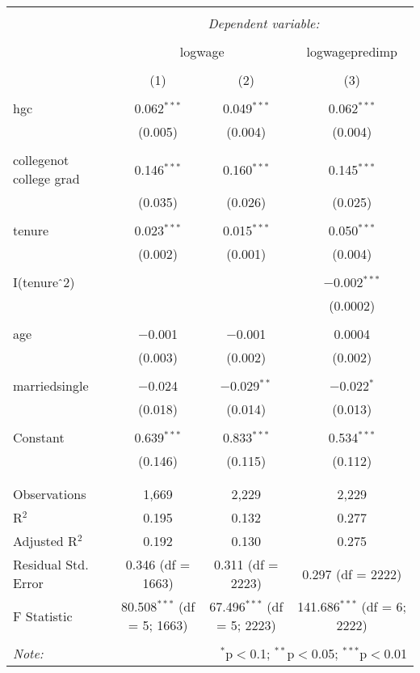 \documentclass{article}
\begin{document}
\begin{table}[!htbp] \centering 
  \caption{} 
  \label{} 
\begin{tabular}{@{\extracolsep{3pt}}lccc} 
\\[-1.7ex]\hline 
\hline \\[-1.8ex] 
 & \multicolumn{3}{c}{\textit{Dependent variable:}} \\ 
\cline{2-4} 
\\[-1.8ex] & \multicolumn{2}{c}{logwage} & logwagepredimp \\ 
\\[-1.8ex] & (1) & (2) & (3)\\ 
\hline \\[-1.8ex] 
 hgc & 0.062$^{***}$ & 0.049$^{***}$ & 0.062$^{***}$ \\ 
  & (0.005) & (0.004) & (0.004) \\ 
  & & & \\ 
 collegenot college grad & 0.146$^{***}$ & 0.160$^{***}$ & 0.145$^{***}$ \\ 
  & (0.035) & (0.026) & (0.025) \\ 
  & & & \\ 
 tenure & 0.023$^{***}$ & 0.015$^{***}$ & 0.050$^{***}$ \\ 
  & (0.002) & (0.001) & (0.004) \\ 
  & & & \\ 
 I(tenure$\hat{\mkern6mu}$2) &  &  & $-$0.002$^{***}$ \\ 
  &  &  & (0.0002) \\ 
  & & & \\ 
 age & $-$0.001 & $-$0.001 & 0.0004 \\ 
  & (0.003) & (0.002) & (0.002) \\ 
  & & & \\ 
 marriedsingle & $-$0.024 & $-$0.029$^{**}$ & $-$0.022$^{*}$ \\ 
  & (0.018) & (0.014) & (0.013) \\ 
  & & & \\ 
 Constant & 0.639$^{***}$ & 0.833$^{***}$ & 0.534$^{***}$ \\ 
  & (0.146) & (0.115) & (0.112) \\ 
  & & & \\ 
\hline \\[-1.8ex] 
Observations & 1,669 & 2,229 & 2,229 \\ 
R$^{2}$ & 0.195 & 0.132 & 0.277 \\ 
Adjusted R$^{2}$ & 0.192 & 0.130 & 0.275 \\ 
Residual Std. Error & 0.346 (df = 1663) & 0.311 (df = 2223) & 0.297 (df = 2222) \\ 
F Statistic & 80.508$^{***}$ (df = 5; 1663) & 67.496$^{***}$ (df = 5; 2223) & 141.686$^{***}$ (df = 6; 2222) \\ 
\hline 
\hline \\[-1.8ex] 
\textit{Note:}  & \multicolumn{3}{r}{$^{*}$p$<$0.1; $^{**}$p$<$0.05; $^{***}$p$<$0.01} \\ 
\end{tabular} 
\end{table} 
\end{document}
